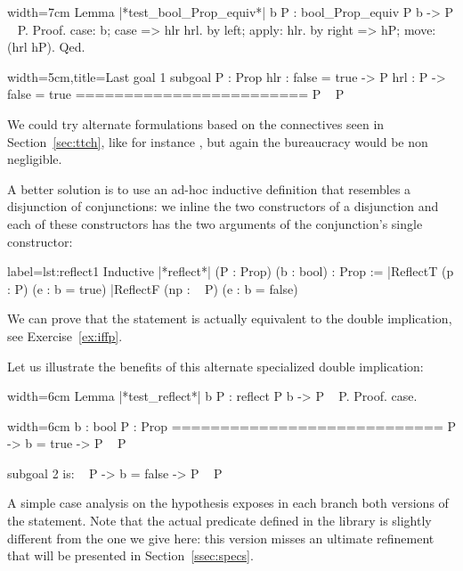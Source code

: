 \begin{coq}{}{width=7cm}
Lemma |*test_bool_Prop_equiv*| b P : bool_Prop_equiv P b -> P \/ ~ P.
Proof.
case: b; case => hlr hrl.
  by left; apply: hlr.
by right => hP; move: (hrl hP).
Qed.
\end{coq}
\begin{coqout}{}{width=5cm,title=Last goal}
1 subgoal
P : Prop
hlr : false = true -> P
hrl : P -> false = true
========================
P \/ ~ P
\end{coqout}
We could try
alternate formulations based on the connectives seen in
Section~\ref{sec:ttch}, like for instance
, but again the bureaucracy
would be non negligible.

A better solution is
to use an ad-hoc inductive definition that resembles a
disjunction of conjunctions: we inline the two constructors of a
disjunction and each of these constructors has the two arguments of
the conjunction's single constructor:

\begin{coq}{}{label=lst:reflect1}
Inductive |*reflect*| (P : Prop) (b : bool) : Prop :=
|ReflectT (p : P)    (e : b = true)
|ReflectF (np : ~ P) (e : b = false)
\end{coq}

We can prove that the statement  is actually equivalent
to the double implication, see Exercise~\ref{ex:iffp}.

Let us illustrate the benefits of this alternate specialized double
implication:

\begin{coq}{}{width=6cm}
Lemma |*test_reflect*| b P :
  reflect P b -> P \/ ~ P.
Proof.
case.
\end{coq}
\begin{coqout}{}{width=6cm}
  b : bool
  P : Prop
  ============================
   P -> b = true -> P \/ ~ P

subgoal 2 is:
 ~ P -> b = false -> P \/ ~ P
\end{coqout}

A simple case analysis on the hypothesis  exposes in
each branch both versions of the statement.
Note that the actual
 predicate defined in the  library is 
slightly different from the one we give here:
this version misses an ultimate refinement
that will be presented in
Section~\ref{ssec:specs}. 

